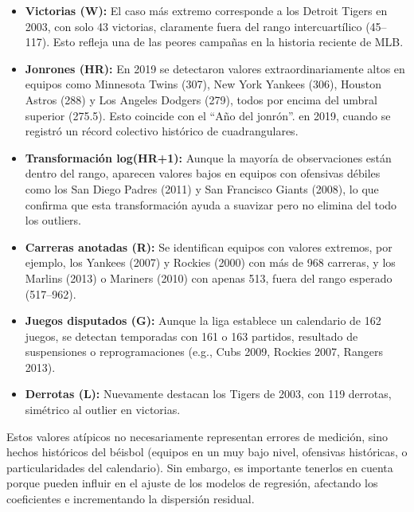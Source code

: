 \documentclass[10pt]{article}
\begin{document}
\begin{itemize}
    \item \textbf{Victorias (W):} El caso más extremo corresponde a los Detroit Tigers en 2003, con solo 43 victorias, claramente fuera del rango intercuartílico (45--117). Esto refleja una de las peores campañas en la historia reciente de MLB.
    \item \textbf{Jonrones (HR):} En 2019 se detectaron valores extraordinariamente altos en equipos como Minnesota Twins (307), New York Yankees (306), Houston Astros (288) y Los Angeles Dodgers (279), todos por encima del umbral superior (275.5). Esto coincide con el ``Año del jonrón''. en 2019, cuando se registró un récord colectivo histórico de cuadrangulares.
    \item \textbf{Transformación log(HR+1):} Aunque la mayoría de observaciones están dentro del rango, aparecen valores bajos en equipos con ofensivas débiles como los San Diego Padres (2011) y San Francisco Giants (2008), lo que confirma que esta transformación ayuda a suavizar pero no elimina del todo los outliers.
    \item \textbf{Carreras anotadas (R):} Se identifican equipos con valores extremos, por ejemplo, los Yankees (2007) y Rockies (2000) con más de 968 carreras, y los Marlins (2013) o Mariners (2010) con apenas 513, fuera del rango esperado (517--962).
    \item \textbf{Juegos disputados (G):} Aunque la liga establece un calendario de 162 juegos, se detectan temporadas con 161 o 163 partidos, resultado de suspensiones o reprogramaciones (e.g., Cubs 2009, Rockies 2007, Rangers 2013).
    \item \textbf{Derrotas (L):} Nuevamente destacan los Tigers de 2003, con 119 derrotas, simétrico al outlier en victorias.
\end{itemize}

Estos valores atípicos no necesariamente representan errores de medición, sino hechos históricos del béisbol (equipos en un muy bajo nivel, ofensivas históricas, o particularidades del calendario). Sin embargo, es importante tenerlos en cuenta porque pueden influir en el ajuste de los modelos de regresión, afectando los coeficientes e incrementando la dispersión residual.
\end{document}
